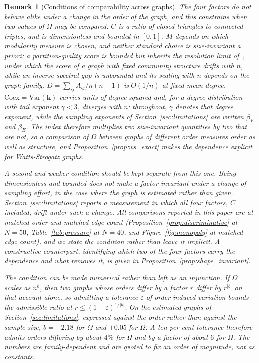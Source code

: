 \documentclass[11pt,a4paper]{article}
\newtheorem{remark}{Remark}
\begin{document}
\begin{remark}[Conditions of comparability across graphs]
\label{rem:comparability}
The four factors do not behave alike under a change in the order of the
graph, and this constrains when two values of $\Omega$ may be compared.
$C$ is a ratio of closed triangles to connected triples, and is
dimensionless and bounded in $[0,1]$. $M$ depends on which modularity
measure is chosen, and neither standard choice is size-invariant a priori:
a partition-quality score is bounded but inherits the resolution limit
of~\cite{fortunato2007}, under which the score of a graph with fixed
community structure drifts with $n$, while an inverse spectral gap is
unbounded and its scaling with $n$ depends on the graph family.
$D = \sum_{ij} A_{ij}/n(n-1)$ is $O(1/n)$ at fixed mean degree.
$\mathrm{Coex} = \mathrm{Var}(\mathbf{k})$ carries units of degree squared
and, for a degree distribution with tail exponent $\gamma < 3$, diverges
with $n$; throughout, $\gamma$ denotes that degree exponent, while the
sampling exponents of Section~\ref{sec:limitations} are written $\beta_V$
and $\beta_E$. The index therefore multiplies two size-invariant quantities by
two that are not, so a comparison of $\Omega$ between graphs of different
order measures order as well as structure, and
Proposition~\ref{prop:ws_exact} makes the dependence explicit for
Watts-Strogatz graphs.

A second and weaker condition should be kept separate from this one. Being
dimensionless and bounded does not make a factor invariant under a change
of \emph{sampling} effort, in the case where the graph is estimated rather
than given. Section~\ref{sec:limitations} reports a measurement in which
all four factors, $C$ included, drift under such a change. All comparisons
reported in this paper are at matched order and matched edge count
(Proposition~\ref{prop:discriminative} at $N = 50$,
Table~\ref{tab:pressure} at $N = 40$, and Figure~\ref{fig:monopoly} at
matched edge count), and we state the condition rather than leave it
implicit. A constructive counterpart, identifying which two of the
four factors carry the dependence and what removes it, is given in
Proposition~\ref{prop:shape_invariant}.

The condition can be made numerical rather than left as an injunction. If
$\Omega$ scales as $n^{b}$, then two graphs whose orders differ by a factor
$r$ differ by $r^{|b|}$ on that account alone, so admitting a tolerance
$\varepsilon$ of order-induced variation bounds the admissible ratio at
$r \le (1+\varepsilon)^{1/|b|}$. On the estimated graphs of
Section~\ref{sec:limitations}, expressed against the order rather than against
the sample size, $b = -2.18$ for $\Omega$ and $+0.05$ for
$\widetilde{\Omega}$. A ten per cent tolerance therefore admits orders
differing by about $4\%$ for $\Omega$ and by a factor of about $6$ for
$\widetilde{\Omega}$. The numbers are family-dependent and are quoted to fix
an order of magnitude, not as constants.


\end{remark}
\end{document}
